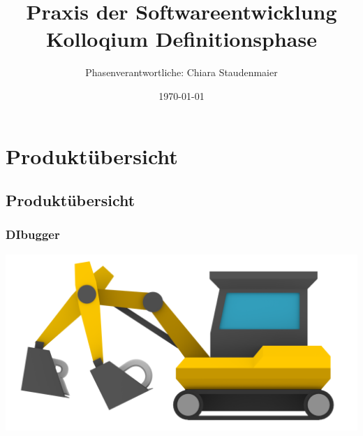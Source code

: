 \documentclass{beamer}
\title[Definitionsphase]{Praxis der Softwareentwicklung\\ Kolloqium Definitionsphase} %
\author{Phasenverantwortliche: Chiara Staudenmaier} %
\institute[PSE] %
{

}
\date{\today} %
\begin{document}
\begin{frame}
\titlepage %
\end{frame}



\section{Produktübersicht} %

\subsection{Produktübersicht} %

\begin{frame}
\frametitle{DIbugger}
\includegraphics[scale=0.3]{../logo_nongi}
\end{frame}
\end{document}
